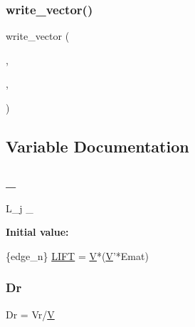 \subsubsection{\texorpdfstring{write\+\_\+vector()}{write\_vector()}\hspace{0.1cm}{\footnotesize\ttfamily [8/8]}}
{\footnotesize\ttfamily write\+\_\+vector (\begin{DoxyParamCaption}\item[{\hyperlink{a00473_ae0527cbfd56392d5095a691bbf10ba5b}{f\+ID}}]{,  }\item[{\hyperlink{a00473_a7bb9d681a4df47c616b79d82759cd0e6}{wf}}]{,  }\item[{\textquotesingle{}\hyperlink{a00473_a7bb9d681a4df47c616b79d82759cd0e6}{wf}\textquotesingle{}}]{ }\end{DoxyParamCaption})}



\subsection{Variable Documentation}
\mbox{\label{a01014_a7d15a4f6e76dff66c5b4314123b32e0d}} 
\subsubsection{\texorpdfstring{\+\_\+}{\_}}
{\footnotesize\ttfamily L\+\_\+j \+\_\+}

{\bfseries Initial value\+:}
\begin{DoxyCode}
\{edge\_n\}
    \hyperlink{a00575_a14c594ef4287da2ed00e98012e0356d9}{LIFT} = \hyperlink{a01014_ac0055fa4cdc19a2690bfee3643413a7d}{V}*(\hyperlink{a01014_ac0055fa4cdc19a2690bfee3643413a7d}{V}\textcolor{stringliteral}{'*Emat)}
\end{DoxyCode}
\mbox{\label{a01014_aa3f5ebfc6bdc8e458334129d39b52461}} 
\subsubsection{\texorpdfstring{Dr}{Dr}}
{\footnotesize\ttfamily Dr = Vr/\hyperlink{a00575_af658e24e5ad7935911c432c5c02d895c}{V}}

